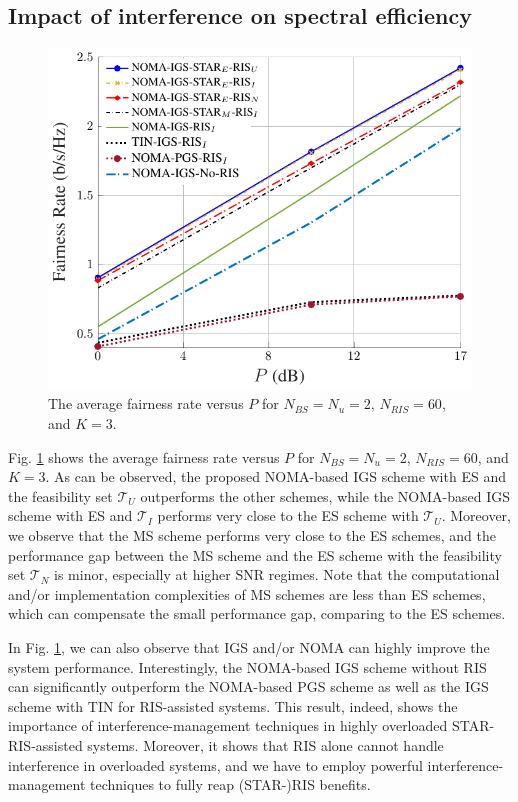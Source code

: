 \documentclass[a4, conference]{IEEEtran}
\theoremstyle{definition}
\begin{document}
\subsection{Impact of interference on spectral efficiency}
\begin{figure}[t!]
    \centering
       \includegraphics[width=.45\textwidth]{K3NRIS60}
    \caption{The average fairness rate versus $P$ for $N_{BS}=N_u=2$, $N_{RIS}=60$, and $K=3$.}
	\label{Fig-sr} 
\end{figure}
Fig. \ref{Fig-sr}  shows the average fairness rate versus $P$ for $N_{BS}=N_u=2$,  $N_{RIS}=60$, and $K=3$. As can be observed, the proposed NOMA-based IGS scheme with ES and the feasibility set $\mathcal{T}_U$ outperforms the other schemes, while the  NOMA-based IGS scheme with ES and $\mathcal{T}_I$ performs very close to the ES scheme with $\mathcal{T}_U$. 
Moreover, we observe that the MS scheme performs very close to the ES schemes, and the performance gap between the MS scheme and the ES scheme with the feasibility set $\mathcal{T}_N$ is minor, especially at higher SNR regimes. 
Note that the computational and/or implementation complexities of MS schemes are less than ES schemes, which can compensate the small performance gap, comparing to the ES schemes. 

In Fig. \ref{Fig-sr}, we can also observe that IGS and/or NOMA can highly improve the system performance. Interestingly, the NOMA-based IGS scheme without RIS can significantly outperform the NOMA-based PGS scheme as well as the IGS scheme with TIN for RIS-assisted systems. This result, indeed, shows the importance of interference-management techniques in highly overloaded STAR-RIS-assisted systems. Moreover, it shows that RIS alone cannot handle interference in overloaded systems, and we have to employ powerful interference-management techniques to fully reap (STAR-)RIS benefits. 
\end{document}

